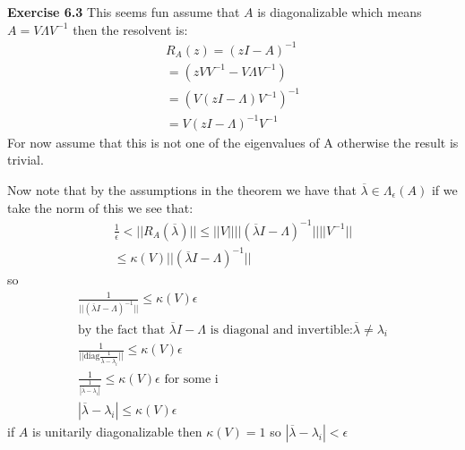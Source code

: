\documentclass[12pt]{article}
\newenvironment{exercise}[1]{\vspace{.1in}\noindent\textbf{Exercise #1 \hspace{.05em}}}{}
\theoremstyle{definition}
\theoremstyle{remark}
\begin{document}
\begin{exercise}{6.3}
	This seems fun assume that $A$ is diagonalizable which means $A=V \Lambda V^{-1}$ then the resolvent is:
	\begin{align}
		R_A(z)=(zI-A)^{-1}           \\
		=(zVV^{-1}-V \Lambda V^{-1}) \\
		=(V(zI-\Lambda)V^{-1})^{-1}  \\
		=V(zI-\Lambda)^{-1}V^{-1}
	\end{align}
	For now assume that this is not one of the eigenvalues of A otherwise the result is trivial.

	Now note that by the assumptions in the theorem we have that $\overline{\lambda}\in \Lambda_\epsilon(A)$
	if we take the norm of this we see that:
	\begin{align}
		\frac{1}{\epsilon}<||R_A(\overline{\lambda })||\leq ||V||||(\overline \lambda I-\Lambda)^{-1}||||V^{-1}|| \\
		\leq \kappa(V)||(\overline \lambda I-\Lambda)^{-1}||
	\end{align}
	so
	\begin{align}
		\frac{1}{||(\overline \lambda I-\Lambda)^{-1}||}\leq \kappa(V)\epsilon                                                   \\
		\text{by the fact that }\overline \lambda I-\Lambda \text{ is diagonal and invertible:} \overline \lambda \neq \lambda_i \\
		\frac{1}{||\text{diag}\frac{1}{\overline \lambda-\lambda_i}||}\leq \kappa(V)\epsilon                                     \\
		\frac{1}{\frac{1}{|\overline \lambda-\lambda_i|}}\leq \kappa(V)\epsilon \text{ for some i}                               \\
		|\overline \lambda -\lambda_i|\leq \kappa(V)\epsilon
	\end{align}
	if $A$ is unitarily diagonalizable then $\kappa (V)=1$ so $|\overline \lambda -\lambda_i|<\epsilon$

\end{exercise}
\end{document}
